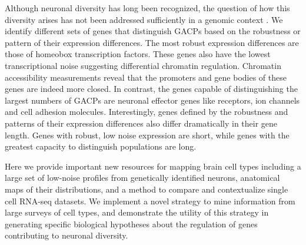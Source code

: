 Although neuronal diversity has long been recognized, the question of how this diversity arises has not been addressed sufficiently in a genomic context \citep{Arendt_2016, Muotri_2006}. We identify different sets of genes that distinguish GACPs based on the robustness or pattern of their expression differences. The most robust expression differences are those of homeobox transcription factors. These genes also have the lowest transcriptional noise suggesting differential chromatin regulation. Chromatin accessibility measurements reveal that the promoters and gene bodies of these genes are indeed more closed. In contrast, the genes capable of distinguishing the largest numbers of GACPs are neuronal effector genes like receptors, ion channels and cell adhesion molecules. Interestingly, genes defined by the robustness and patterns of their expression differences also differ dramatically in their gene length. Genes with robust, low noise expression are short, while genes with the greatest capacity to distinguish populations are long.

Here we provide important new resources for mapping brain cell types including a large set of low-noise profiles from genetically identified neurons, anatomical maps of their distributions, and a method to compare and contextualize single cell RNA-seq datasets. We implement a novel strategy to mine information from large surveys of cell types, and demonstrate the utility of this strategy in generating specific biological hypotheses about the regulation of genes contributing to neuronal diversity.


